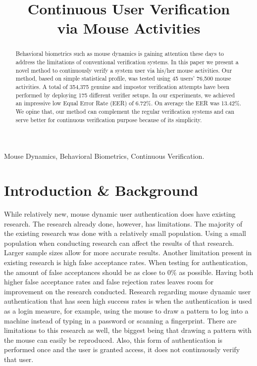 \documentclass[conference]{IEEEtran}
\title{Continuous User Verification\\via Mouse Activities}
\begin{document}
\maketitle


\begin{abstract}
Behavioral biometrics such as mouse dynamics is gaining attention these days to address the limitations of
conventional verification systems. In this paper we present a novel method to continuously verify a system user via
his/her mouse activities. Our method, based on simple statistical profile, was tested using 45 users’ 76,500 mouse activities.
A total of 354,375 genuine and impostor verification attempts have been performed by deploying 175 different verifier
setups. In our experiments, we achieved an impressive low Equal Error Rate (EER) of 6.72\%. On average the EER
was 13.42\%. We opine that, our method can complement the regular verification systems and can serve better for
continuous verification purpose because of its simplicity.
\end{abstract}
\begin{IEEEkeywords} 
Mouse Dynamics,
Behavioral Biometrics,
Continuous Verification.
 \end{IEEEkeywords}
\IEEEpeerreviewmaketitle

\section{Introduction \& Background}


While relatively new, mouse dynamic user authentication does have existing research. The research already done, however, has limitations. The majority of the existing research was done with a relatively small population. Using a small population when conducting research can affect the results of that research. Larger sample sizes allow for more accurate results. Another limitation present in existing research is high false acceptance rates. When testing for authentication, the amount of false acceptances should be as close to 0\% as possible. Having both higher false acceptance rates and false rejection rates leaves room for improvement on the research conducted. Research regarding mouse dynamic user authentication that has seen high success rates is when the authentication is used as a login measure, for example, using the mouse to draw a pattern to log into a machine instead of typing in a password or scanning a fingerprint. There are limitations to this research as well, the biggest being that drawing a pattern with the mouse can easily be reproduced. Also, this form of authentication is performed once and the user is granted access, it does not continuously verify that user.
\end{document}
